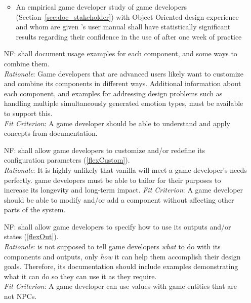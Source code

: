 \begin{itemize}[wide=0pt, leftmargin=*]
\begin{itemize}[noitemsep, nosep]
        \item An empirical game developer study of game developers
        (Section~\ref{sec:doc_stakeholder}) with Object-Oriented design
        experience and whom are given \progname{}'s user manual shall have
        statistically significant results regarding their confidence in the use
        of \progname{} after one week of practice
    \end{itemize}

    \item[NF\refstepcounter{nfnum}\thenfnum \label{N_Manual}:] \progname{}
    shall document usage examples for each component, and some ways to combine
    them. \vspace*{1mm}\\
    \textit{Rationale}: Game developers that are advanced \progname{} users
    likely want to customize \progname{} and combine its components in
    different ways. Additional information about each component, and examples
    for addressing design problems such as handling multiple simultaneously
    generated emotion types, must be available to support this.
    \vspace*{1mm}\\
    \textit{Fit Criterion}: A game developer should be able to understand and
    apply concepts from \progname{} documentation.

    \item[NF\refstepcounter{nfnum}\thenfnum \label{N_Custom}:]  \progname{}
    shall allow game developers to customize and/or redefine its configuration
    parameters (\ref{flexCustom}). \vspace*{1mm}\\
    \textit{Rationale}: It is highly unlikely that vanilla \progname{} will
    meet a game developer's needs perfectly. game developers must be able to
    tailor \progname{} for their purposes to increase its longevity and
    long-term impact. \linebreak
    \textit{Fit Criterion}: A game developer should be able to modify and/or
    add a \progname{} component without affecting other parts of the system.

    \item[NF\refstepcounter{nfnum}\thenfnum \label{N_Output}:]  \progname{}
    shall allow game developers to specify how to use its outputs and/or states
    (\ref{flexOut}). \vspace*{1mm}\\
    \textit{Rationale}: \progname{} is not supposed to tell game developers
    \textit{what} to do with its components and outputs, only \textit{how} it
    can help them accomplish their design goals. Therefore, its documentation
    should include examples demonstrating what it can do so they can use it as
    they require. \vspace*{1mm}\\
    \textit{Fit Criterion}: A game developer can use \progname{} values with
    game entities that are not NPCs.


\end{itemize}
